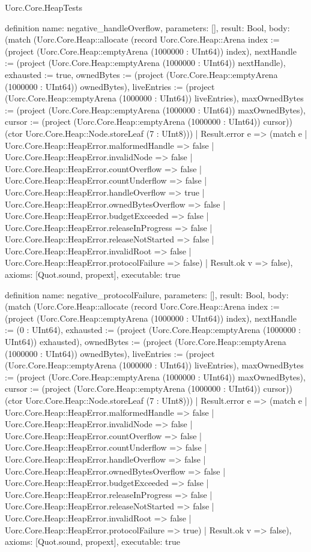 \begin{lexlean}{Uorc.Core.HeapTests}
\begin{semanticmodule}
definition{
  name: negative_handleOverflow,
  parameters: [],
  result: Bool,
  body: (match (Uorc.Core.Heap::allocate (record Uorc.Core.Heap::Arena {index := (project (Uorc.Core.Heap::emptyArena (1000000 : UInt64)) index), nextHandle := (project (Uorc.Core.Heap::emptyArena (1000000 : UInt64)) nextHandle), exhausted := true, ownedBytes := (project (Uorc.Core.Heap::emptyArena (1000000 : UInt64)) ownedBytes), liveEntries := (project (Uorc.Core.Heap::emptyArena (1000000 : UInt64)) liveEntries), maxOwnedBytes := (project (Uorc.Core.Heap::emptyArena (1000000 : UInt64)) maxOwnedBytes), cursor := (project (Uorc.Core.Heap::emptyArena (1000000 : UInt64)) cursor)}) (ctor Uorc.Core.Heap::Node.storeLeaf (7 : UInt8)))
    | Result.error e => (match e
      | Uorc.Core.Heap::HeapError.malformedHandle => false
      | Uorc.Core.Heap::HeapError.invalidNode => false
      | Uorc.Core.Heap::HeapError.countOverflow => false
      | Uorc.Core.Heap::HeapError.countUnderflow => false
      | Uorc.Core.Heap::HeapError.handleOverflow => true
      | Uorc.Core.Heap::HeapError.ownedBytesOverflow => false
      | Uorc.Core.Heap::HeapError.budgetExceeded => false
      | Uorc.Core.Heap::HeapError.releaseInProgress => false
      | Uorc.Core.Heap::HeapError.releaseNotStarted => false
      | Uorc.Core.Heap::HeapError.invalidRoot => false
      | Uorc.Core.Heap::HeapError.protocolFailure => false)
    | Result.ok v => false),
  axioms: [Quot.sound, propext],
  executable: true
}

definition{
  name: negative_protocolFailure,
  parameters: [],
  result: Bool,
  body: (match (Uorc.Core.Heap::allocate (record Uorc.Core.Heap::Arena {index := (project (Uorc.Core.Heap::emptyArena (1000000 : UInt64)) index), nextHandle := (0 : UInt64), exhausted := (project (Uorc.Core.Heap::emptyArena (1000000 : UInt64)) exhausted), ownedBytes := (project (Uorc.Core.Heap::emptyArena (1000000 : UInt64)) ownedBytes), liveEntries := (project (Uorc.Core.Heap::emptyArena (1000000 : UInt64)) liveEntries), maxOwnedBytes := (project (Uorc.Core.Heap::emptyArena (1000000 : UInt64)) maxOwnedBytes), cursor := (project (Uorc.Core.Heap::emptyArena (1000000 : UInt64)) cursor)}) (ctor Uorc.Core.Heap::Node.storeLeaf (7 : UInt8)))
    | Result.error e => (match e
      | Uorc.Core.Heap::HeapError.malformedHandle => false
      | Uorc.Core.Heap::HeapError.invalidNode => false
      | Uorc.Core.Heap::HeapError.countOverflow => false
      | Uorc.Core.Heap::HeapError.countUnderflow => false
      | Uorc.Core.Heap::HeapError.handleOverflow => false
      | Uorc.Core.Heap::HeapError.ownedBytesOverflow => false
      | Uorc.Core.Heap::HeapError.budgetExceeded => false
      | Uorc.Core.Heap::HeapError.releaseInProgress => false
      | Uorc.Core.Heap::HeapError.releaseNotStarted => false
      | Uorc.Core.Heap::HeapError.invalidRoot => false
      | Uorc.Core.Heap::HeapError.protocolFailure => true)
    | Result.ok v => false),
  axioms: [Quot.sound, propext],
  executable: true
}


\end{semanticmodule}
\end{lexlean}
